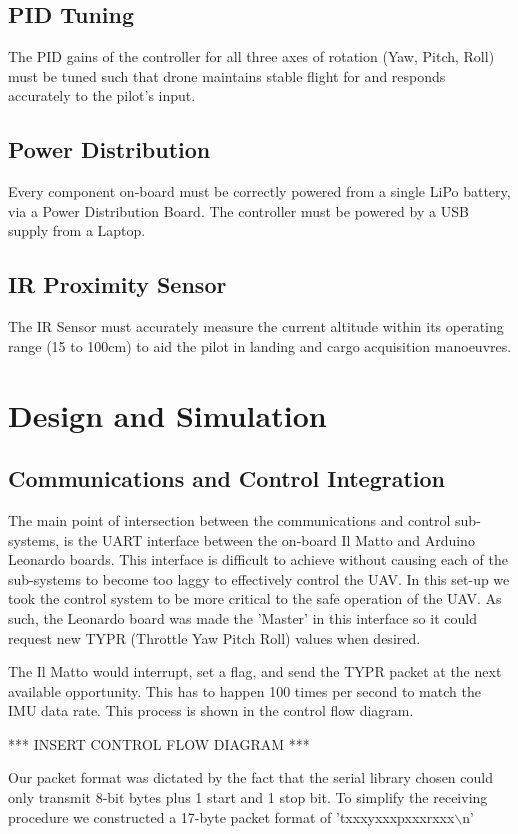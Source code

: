 \documentclass[a4paper,11pt]{article}
\begin{document}
\subsection{PID Tuning}
The PID gains of the controller for all three axes of rotation (Yaw, Pitch, Roll) must be tuned such that drone maintains stable flight for and responds accurately to the pilot's input.
\subsection{Power Distribution}
Every component on-board must be correctly powered from a single LiPo battery, via a Power Distribution Board. The controller must be powered by a USB supply from a Laptop.
\subsection{IR Proximity Sensor}
The IR Sensor must accurately measure the current altitude within its operating range (15 to 100cm) to aid the pilot in landing and cargo acquisition manoeuvres.

\section{Design and Simulation}
\subsection{Communications and Control Integration}
The main point of intersection between the communications and control sub-systems, is the UART interface between the on-board Il Matto and Arduino Leonardo boards. This interface is difficult to achieve without causing each of the sub-systems to become too laggy to effectively control the UAV. In this set-up we took the control system to be more critical to the safe operation of the UAV. As such, the Leonardo board was made the 'Master' in this interface so it could request new TYPR (Throttle Yaw Pitch Roll) values when desired.

 The Il Matto would interrupt, set a flag, and send the TYPR packet at the next available opportunity. This has to happen 100 times per second to match the IMU data rate. This process is shown in the control flow diagram.

*** INSERT CONTROL FLOW DIAGRAM ***

Our packet format was dictated by the fact that the serial library chosen could only transmit 8-bit bytes plus 1 start and 1 stop bit. To simplify the receiving procedure we constructed a 17-byte packet format of 'txxxyxxxpxxxrxxx$\backslash$n'
\end{document}
